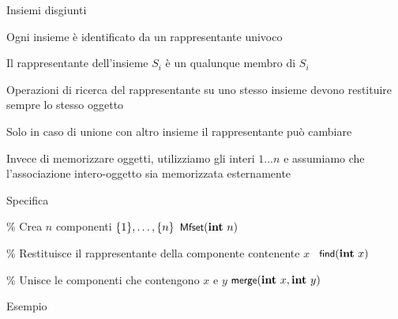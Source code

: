 \begin{frame}{Insiemi disgiunti}

\BIL
\item Ogni insieme è identificato da un \alert{rappresentante} univoco
\item Il rappresentante  dell'insieme $S_i$  è un qualunque membro di $S_i$
\item Operazioni di ricerca del rappresentante su uno stesso insieme devono restituire sempre lo stesso oggetto
\item Solo in caso di unione con altro insieme il rappresentante può cambiare
\EIL

\smallskip
Invece di memorizzare oggetti, utilizziamo gli interi $1 \ldots n$
e assumiamo che l'associazione intero-oggetto sia memorizzata esternamente

\end{frame}

\begin{frame}{Specifica}

\begin{Procedure}
\caption[A]{\mfset}

\BlankLine
\% Crea $n$ componenti $\{1\}, \ldots, \{n\}$\;
\mfset $\mfconstructor(\INTEGER\ n)$\;

\BlankLine
\% Restituisce il rappresentante della componente contenente $x$\;
\INTEGER\ $\mffind(\INTEGER\ x)$\;

\BlankLine
\% Unisce le componenti che contengono $x$ e $y$\;
$\mfmerge(\INTEGER\ x, \INTEGER\ y)$\;
 
\BlankLine
\end{Procedure}

\end{frame}

\begin{frame}{Esempio}
\end{frame}

